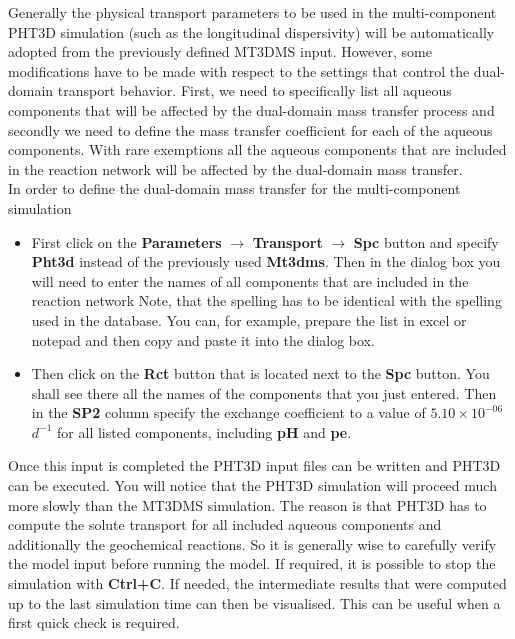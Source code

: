 Generally the physical transport parameters to be 
used in the multi-component PHT3D 
simulation (such as the longitudinal dispersivity) 
will be automatically adopted from the previously 
defined MT3DMS input. However, some modifications
have to be made with respect to the settings that control
the dual-domain transport behavior.
First, we need to specifically list all aqueous components that
will be affected by the dual-domain mass transfer process
and secondly we need to define the mass transfer coefficient 
for each of the aqueous components. 
With rare exemptions all the aqueous components that are 
included in the reaction network will be affected by the dual-domain
mass transfer.
\\
In order to define the dual-domain mass transfer for the 
multi-component simulation 
\begin{itemize}
\item First click on the 
{\color{blue}\textbf{Parameters}} 
$\rightarrow$ {\color{blue}\textbf{Transport}}
$\rightarrow$ {\color{blue}\textbf{Spc}}
button and specify {\color{blue}\textbf{Pht3d}} instead 
of the previously used {\color{blue}\textbf{Mt3dms}}. 
Then in the dialog box you will need to enter the names 
of all components that are included in the reaction network
Note, that the spelling has to be identical with
the spelling used in the database. You can, for example,
prepare the list in excel or notepad
and then copy and paste it into the dialog box.
\item Then click on the {\color{blue}\textbf{Rct}} 
button that is located next to the
{\color{blue}\textbf{Spc}} button. You shall see there all the 
names of the components that you just entered. 
Then in the {\color{blue}\textbf{SP2}} column specify 
the exchange coefficient to a value of 
$5.10 \times 10^{-06}$ $d^{-1}$
for all listed components, 
including {\color{blue}\textbf{pH}} and {\color{blue}\textbf{pe}}.
\end{itemize}

Once this input is completed the PHT3D input files can be 
written and PHT3D can be executed. 
You will notice that the PHT3D simulation will proceed 
much more slowly than the MT3DMS simulation.
The reason is that PHT3D has to compute the solute transport for 
all included aqueous components and additionally 
the geochemical reactions.
So it is generally wise to carefully verify the model input 
before running the model. If required, it is possible 
to stop the simulation with {\color{blue}\textbf{Ctrl+C}}.
If needed, the intermediate results that were computed up to the last 
simulation time can then be visualised. This can be useful
when a first quick check is required. 

